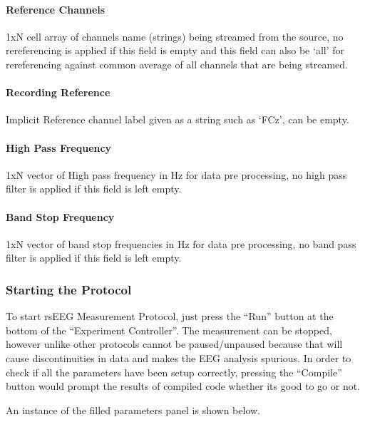 \documentclass[letterpaper,10pt,english]{sphinxmanual}
\begin{document}
\paragraph{Reference Channels}
\label{\detokenize{10_rsEEGMeasurement:reference-channels}}
\sphinxAtStartPar
1xN cell array of channels name (strings) being streamed from the source, no rereferencing is applied if this field is empty and this field can also be ‘all’ for rereferencing against common average of all channels that are being streamed.


\paragraph{Recording Reference}
\label{\detokenize{10_rsEEGMeasurement:recording-reference}}
\sphinxAtStartPar
Implicit Reference channel label given as a string such as ‘FCz’, can be empty.


\paragraph{High Pass Frequency}
\label{\detokenize{10_rsEEGMeasurement:high-pass-frequency}}
\sphinxAtStartPar
1xN vector of High pass frequency in Hz for data pre processing, no high pass filter is applied if this field is left empty.


\paragraph{Band Stop Frequency}
\label{\detokenize{10_rsEEGMeasurement:band-stop-frequency}}
\sphinxAtStartPar
1xN vector of band stop frequencies in Hz for data pre processing, no band pass filter is applied if this field is left empty.


\subsubsection{Starting the Protocol}
\label{\detokenize{10_rsEEGMeasurement:starting-the-protocol}}
\sphinxAtStartPar
To start rsEEG Measurement Protocol, just press the “Run” button at the bottom of the “Experiment Controller”. The measurement can be stopped, however unlike other protocols cannot be paused/unpaused because that will cause discontinuities in data and makes the EEG analysis spurious. In order to check if all the parameters have been setup correctly, pressing the “Compile” button would prompt the results of compiled code whether its good to go or not.

\sphinxAtStartPar
An instance of the filled parameters panel is shown below.
\end{document}
